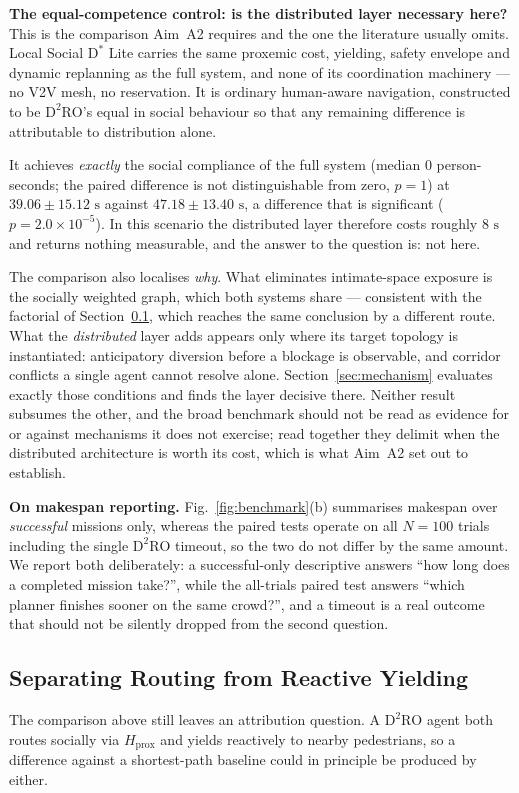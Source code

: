 \documentclass[journal]{IEEEtran}
\begin{document}
\textbf{The equal-competence control: is the distributed layer necessary here?}
This is the comparison Aim~A2 requires and the one the literature usually omits.
Local Social $\text{D}^*$ Lite carries the same proxemic cost, yielding, safety
envelope and dynamic replanning as the full system, and none of its coordination
machinery --- no V2V mesh, no reservation. It is ordinary human-aware navigation,
constructed to be $\text{D}^2\text{RO}$'s equal in social behaviour so that any
remaining difference is attributable to distribution alone.

It achieves \emph{exactly} the social compliance of the full system (median $0$
person-seconds; the paired difference is not distinguishable from zero, $p = 1$) at
$39.06 \pm 15.12\text{ s}$ against $47.18 \pm 13.40\text{ s}$, a difference that is
significant ($p = 2.0\times10^{-5}$). In this scenario the distributed layer
therefore costs roughly $8\text{ s}$ and returns nothing measurable, and the answer
to the question is: not here.

The comparison also localises \emph{why}. What eliminates intimate-space exposure is
the socially weighted graph, which both systems share --- consistent with the
factorial of Section~\ref{sec:factorial}, which reaches the same conclusion by a
different route. What the \emph{distributed} layer adds appears only where its target
topology is instantiated: anticipatory diversion before a blockage is observable, and
corridor conflicts a single agent cannot resolve alone. Section~\ref{sec:mechanism}
evaluates exactly those conditions and finds the layer decisive there. Neither result
subsumes the other, and the broad benchmark should not be read as evidence for or
against mechanisms it does not exercise; read together they delimit when the
distributed architecture is worth its cost, which is what Aim~A2 set out to
establish.

\textbf{On makespan reporting.} Fig.~\ref{fig:benchmark}(b) summarises makespan over
\emph{successful} missions only, whereas the paired tests operate on all $N=100$
trials including the single $\text{D}^2\text{RO}$ timeout, so the two do not differ
by the same amount. We report both deliberately: a successful-only descriptive
answers ``how long does a completed mission take?'', while the all-trials paired test
answers ``which planner finishes sooner on the same crowd?'', and a timeout is a real
outcome that should not be silently dropped from the second question.

\subsection{Separating Routing from Reactive Yielding}
\label{sec:factorial}
The comparison above still leaves an attribution question. A $\text{D}^2\text{RO}$ agent both routes socially via $H_{\text{prox}}$ and yields reactively to nearby pedestrians, so a difference against a shortest-path baseline could in principle be produced by either.
\end{document}
